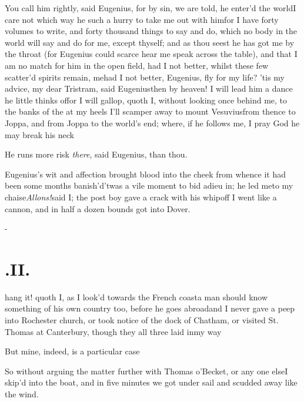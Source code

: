 \documentclass{article}
\begin{document}
\tsk You call him rightly, said Eugenius,\break
\tsk for by sin, we are told, he enter’d the world\tsh I care not which way he
 such a hurry to take me out with him\tsk for
I have forty volumes to write, and forty thousand things to say and do, which no body
in the world will say and do for me, except thyself; and as thou seest he has got
me by the throat (for\break
Eugenius could scarce hear me speak across the table), and
that I am no match for him in the open field, had I not better, 
whilst these few scatter’d spirits remain, 
me\tsk had I not better, Eugenius, fly for my life? ’tis my
advice, my dear Tristram, said Eugenius\tsk then by heaven! I
will lead him a dance he little thinks of\tsh for I will gallop,
quoth I, without looking once behind me, to the banks of the
 at my heels\tsh
I’ll scamper away to mount Vesuvius\tsh from thence to Jop\-pa,
and from Joppa to the world’s end; where, if he follows me, I
pray God he may break his neck\tsh{}

\tsh He runs more risk \textit{there}, said Eugenius,
than thou.

Eugenius’s wit and affection brought blood into the
cheek from whence it had been some months
banish’d\tsh ’twas a vile moment to bid adieu
in; he led me\break to my chaise\tsh \textit{Allons!}\@ said I; the
post boy gave a crack with his whip\tsh off I went like a
cannon, and in half a dozen bounds got into Dover.

\vfill{}\eject
\null\kern-\baselineskip
\section{.\enspace II.}

 hang it! quoth I, as I look’d towards the French coast\tsk a man should
know something of his own\break
country too, before he goes abroad\tsh and I never gave a
peep into Rochester church, or took notice of the dock of Chatham, or visited St.\@
Thomas at Canterbury, though they all three laid in\break my way\tsh

\tsk But mine, indeed, is a particular case\tsh

So without arguing the matter further with Thomas o’Becket, or any one else\tsk I
skip’d into the boat, and in five minutes we got under sail and scudded away like
the wind.
\end{document}
